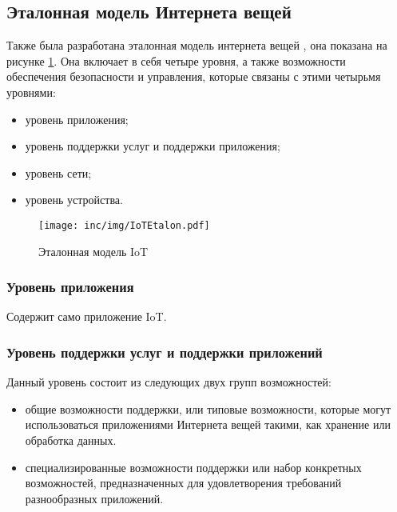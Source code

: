 \subsection{Эталонная модель Интернета вещей}

Также была разработана эталонная модель интернета вещей \cite{itutiot2012}, она показана на рисунке \ref{fig:iotetalon}.
Она включает в себя четыре уровня, а также возможности обеспечения безопасности и управления, которые связаны с этими четырьмя уровнями:

\begin{itemize}
	\item уровень приложения;
	\item уровень поддержки услуг и поддержки приложения;
	\item уровень сети;
	\item уровень устройства.
\end{itemize}

\begin{figure}
  \centering
  \texttt{[image: inc/img/IoTEtalon.pdf]}
	\caption{Эталонная модель IoT}
  \label{fig:iotetalon}
\end{figure}


\subsubsection{Уровень приложения}

Содержит само приложение IoT.


\subsubsection{Уровень поддержки услуг и поддержки приложений}

Данный уровень состоит из следующих двух групп возможностей:

\begin{itemize}
	\item общие возможности поддержки, или типовые возможности, которые 
могут использоваться приложениями Интернета вещей такими, как хранение или 
обработка данных.
	\item специализированные возможности поддержки или набор конкретных возможностей, предназначенных для удовлетворения требований разнообразных приложений.
\end{itemize}


